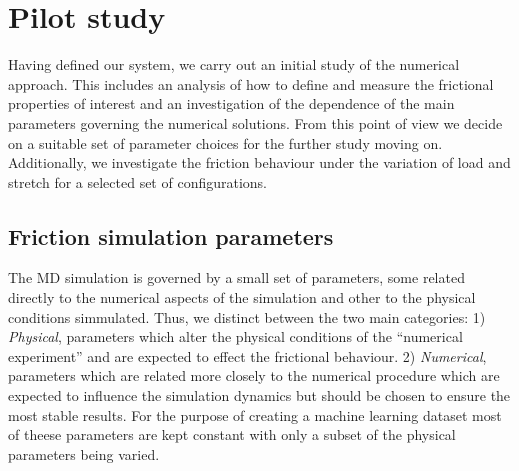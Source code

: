 


\chapter{Pilot study}
Having defined our system, we carry out an initial study of the numerical approach. This includes an analysis of how to define and measure the frictional properties of interest and an investigation of the dependence of the main parameters governing the numerical solutions. From this point of view we decide on a suitable set of parameter choices for the further study moving on. Additionally, we investigate the friction behaviour under the variation of load and stretch for a selected set of configurations. 


\section{Friction simulation parameters}
The \acrshort{MD} simulation is governed by a small set of parameters, some
related directly to the numerical aspects of the simulation and other to the
physical conditions simmulated. Thus, we distinct between the two main
categories: 1) \textit{Physical}, parameters which alter the physical conditions
of the ``numerical experiment'' and are expected to effect the frictional
behaviour. 2) \textit{Numerical}, parameters which are related more closely to
the numerical procedure which are expected to influence the simulation dynamics
but should be chosen to ensure the most stable results. For the purpose of
creating a machine learning dataset most of theese parameters are kept constant
with only a subset of the physical parameters being varied. 

%
%

